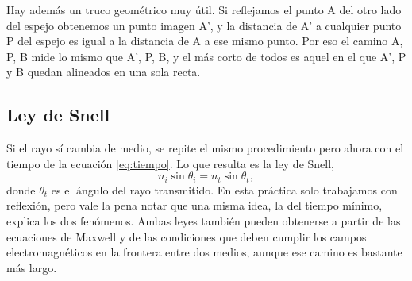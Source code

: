 Hay además un truco geométrico muy útil. Si reflejamos el punto A del otro lado del espejo obtenemos un punto imagen A', y la distancia de A' a cualquier punto P del espejo es igual a la distancia de A a ese mismo punto. Por eso el camino A, P, B mide lo mismo que A', P, B, y el más corto de todos es aquel en el que A', P y B quedan alineados en una sola recta.

\subsection{Ley de Snell}
Si el rayo sí cambia de medio, se repite el mismo procedimiento pero ahora con el tiempo de la ecuación \eqref{eq:tiempo}. Lo que resulta es la ley de Snell,
\begin{equation}
n_i \sin\theta_i = n_t \sin\theta_t ,
\label{eq:snell}
\end{equation}
donde $\theta_t$ es el ángulo del rayo transmitido. En esta práctica solo trabajamos con reflexión, pero vale la pena notar que una misma idea, la del tiempo mínimo, explica los dos fenómenos. Ambas leyes también pueden obtenerse a partir de las ecuaciones de Maxwell y de las condiciones que deben cumplir los campos electromagnéticos en la frontera entre dos medios, aunque ese camino es bastante más largo.
